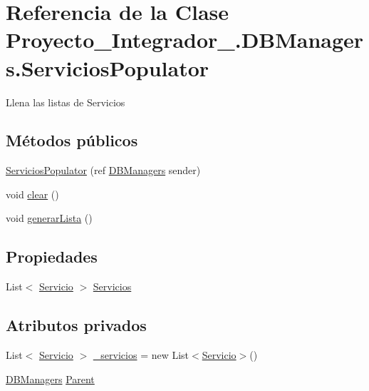 \hypertarget{class_proyecto___integrador__3_1_1_d_b_managers_1_1_servicios_populator}{\section{Referencia de la Clase Proyecto\-\_\-\-Integrador\-\_.\-D\-B\-Managers.\-Servicios\-Populator}
\label{class_proyecto___integrador__3_1_1_d_b_managers_1_1_servicios_populator}
}


Llena las listas de Servicios  


\subsection*{Métodos públicos}
\begin{DoxyCompactItemize}
\item 
\hyperlink{class_proyecto___integrador__3_1_1_d_b_managers_1_1_servicios_populator_a45260aa2e86962a10e44f3f7faefbf15}{Servicios\-Populator} (ref \hyperlink{class_proyecto___integrador__3_1_1_d_b_managers}{D\-B\-Managers} sender)
\item 
void \hyperlink{class_proyecto___integrador__3_1_1_d_b_managers_1_1_servicios_populator_a61cb2ea7726cffeac2da8df50a0dd347}{clear} ()
\item 
void \hyperlink{class_proyecto___integrador__3_1_1_d_b_managers_1_1_servicios_populator_a9ac6be7f5ecdbdadd850b3519a985f75}{generar\-Lista} ()
\end{DoxyCompactItemize}
\subsection*{Propiedades}
\begin{DoxyCompactItemize}
\item 
List$<$ \hyperlink{class_proyecto___integrador__3_1_1_tipos_dato_1_1_servicio}{Servicio} $>$ \hyperlink{class_proyecto___integrador__3_1_1_d_b_managers_1_1_servicios_populator_a5c0044cf4a9e52ee30c25cfcb8112876}{Servicios}
\end{DoxyCompactItemize}
\subsection*{Atributos privados}
\begin{DoxyCompactItemize}
\item 
List$<$ \hyperlink{class_proyecto___integrador__3_1_1_tipos_dato_1_1_servicio}{Servicio} $>$ \hyperlink{class_proyecto___integrador__3_1_1_d_b_managers_1_1_servicios_populator_af7501f1e6be90cfec6b9b974b6d8b911}{\-\_\-servicios} = new List$<$\hyperlink{class_proyecto___integrador__3_1_1_tipos_dato_1_1_servicio}{Servicio}$>$()
\item 
\hyperlink{class_proyecto___integrador__3_1_1_d_b_managers}{D\-B\-Managers} \hyperlink{class_proyecto___integrador__3_1_1_d_b_managers_1_1_servicios_populator_a56aa6fea49cfd991726dc8c67e4e1742}{Parent}
\end{DoxyCompactItemize}


